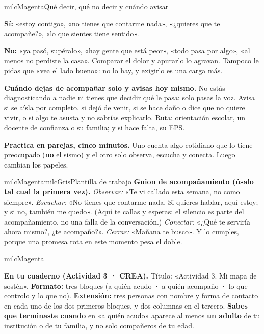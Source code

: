 \documentclass[11pt,letterpaper]{article}
\begin{document}
\begin{drawbox}{milcMagenta}{Qué decir, qué no decir y cuándo avisar}
\begin{checklista}
\item \textbf{Sí:} «estoy contigo», «no tienes que contarme nada», «¿quieres que te acompañe?», «lo que sientes tiene sentido».
\item \textbf{No:} «ya pasó, supéralo», «hay gente que está peor», «todo pasa por algo», «al menos no perdiste la casa». Comparar el dolor y apurarlo lo agravan. Tampoco le pidas que «vea el lado bueno»: no lo hay, y exigirlo es una carga más.
\item \textbf{Cuándo dejas de acompañar solo y avisas hoy mismo.} No estás diagnosticando a nadie ni tienes que decidir qué le pasa: solo pasas la voz. Avisa si se aísla por completo, si dejó de venir, si se hace daño o dice que no quiere vivir, o si algo te asusta y no sabrías explicarlo. Ruta: orientación escolar, un docente de confianza o su familia; y si hace falta, su EPS.
\item \textbf{Practica en parejas, cinco minutos.} Uno cuenta algo cotidiano que lo tiene preocupado (\textbf{no} el sismo) y el otro solo observa, escucha y conecta. Luego cambian los papeles.
\end{checklista}
\end{drawbox}

\begin{softbox}{milcMagenta}{milcGris}{Plantilla de trabajo}
\textbf{Guion de acompañamiento (úsalo tal cual la primera vez).} \emph{Observar:} «Te vi callado esta semana, no como siempre». \emph{Escuchar:} «No tienes que contarme nada. Si quieres hablar, aquí estoy; y si no, también me quedo». (Aquí te callas y esperas: el silencio es parte del acompañamiento, no una falla de la conversación.) \emph{Conectar:} «¿Qué te serviría ahora mismo?, ¿te acompaño?». \emph{Cerrar:} «Mañana te busco». Y lo cumples, porque una promesa rota en este momento pesa el doble.
\end{softbox}

\begin{infoband}{milcMagenta}


\textbf{En tu cuaderno (Actividad 3 · CREA).} Título: «Actividad 3. Mi mapa de sostén». \textbf{Formato:} tres bloques (a quién acudo · a quién acompaño · lo que controlo y lo que no). \textbf{Extensión:} tres personas con nombre y forma de contacto en cada uno de los dos primeros bloques, y dos columnas en el tercero. \textbf{Sabes que terminaste cuando} en «a quién acudo» aparece al menos \textbf{un adulto} de tu institución o de tu familia, y no solo compañeros de tu edad.
\end{infoband}
\end{document}

